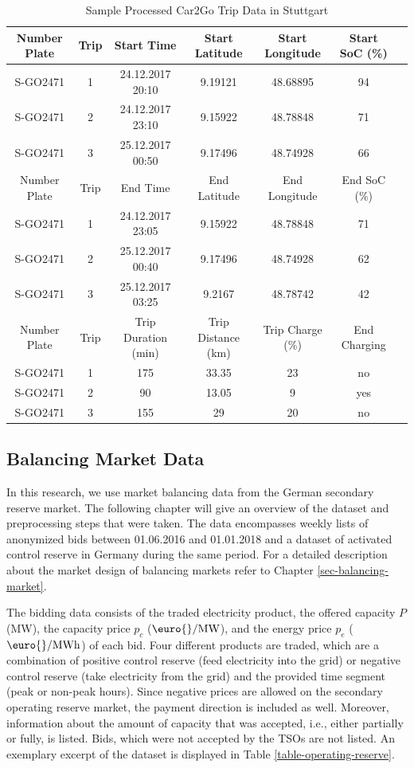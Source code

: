 \documentclass[a4paper, 12pt]{article}
\begin{document}
\begin{table}
    \caption{Sample Processed Car2Go Trip Data in Stuttgart \label{table-car2go-processed}}
    \centering
    \begin{tabular}{cc|ccccc}
      \hline
      \hline
      Number Plate & Trip & Start Time & Start Latitude & Start Longitude & Start SoC (\%)\\
      \hline
      S-GO2471 & 1 & 24.12.2017 20:10 & 9.19121 & 48.68895 & 94\\
      S-GO2471 & 2 & 24.12.2017 23:10 & 9.15922 & 48.78848 & 71\\
      S-GO2471 & 3 & 25.12.2017 00:50 & 9.17496 & 48.74928 & 66\\
      \hline
      Number Plate & Trip & End Time & End Latitude & End Longitude & End SoC (\%)\\
      \hline
      S-GO2471 & 1 & 24.12.2017 23:05 & 9.15922 & 48.78848 & 71\\
      S-GO2471 & 2 & 25.12.2017 00:40 & 9.17496 & 48.74928 & 62\\
      S-GO2471 & 3 & 25.12.2017 03:25 & 9.2167 & 48.78742 & 42\\
      \hline
      Number Plate & Trip & Trip Duration (min) & Trip Distance (km) & Trip Charge (\%) & End Charging\\
      \hline
      S-GO2471 & 1 & 175 & 33.35 & 23 & no\\
      S-GO2471 & 2 & 90 & 13.05 & 9 & yes\\
      S-GO2471 & 3 & 155 & 29 & 20 & no\\
      \hline
      \hline
    \end{tabular}
\end{table}

\subsection{Balancing Market Data}
\label{sec:orge0f99c8}
In this research, we use market balancing data from the German secondary reserve
market. The following chapter will give an overview of the dataset and
preprocessing steps that were taken. The data encompasses weekly lists of
anonymized bids between 01.06.2016 and 01.01.2018 and a dataset of activated
control reserve in Germany during the same period. For a detailed description
about the market design of balancing markets refer to Chapter
\ref{sec-balancing-market}.

The bidding data consists of the traded electricity product, the offered
capacity \(P\) (MW), the capacity price \(p_c\) (\(\text{\euro{}/MW}\)), and the
energy price \(p_e\) (\(\text{\euro{}/MWh}\)) of each bid. Four different products
are traded, which are a combination of positive control reserve (feed
electricity into the grid) or negative control reserve (take electricity from
the grid) and the provided time segment (peak or non-peak hours). Since negative
prices are allowed on the secondary operating reserve market, the payment
direction is included as well. Moreover, information about the amount of
capacity that was accepted, i.e., either partially or fully, is listed. Bids,
which were not accepted by the TSOs are not listed. An exemplary excerpt of the
dataset is displayed in Table \ref{table-operating-reserve}.
\end{document}
